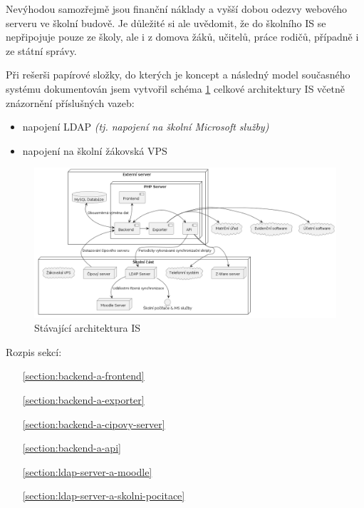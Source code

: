 \documentclass[FM,Proj]{tulthesis}
\begin{document}
Nevýhodou samozřejmě jsou finanční náklady a vyšší dobou odezvy webového serveru 
ve školní budově. Je důležité si ale uvědomit, že do školního IS se nepřipojuje 
pouze ze školy, ale i z domova žáků, učitelů, práce rodičů, případně i ze státní správy.  

Při rešerši papírové složky, do kterých je koncept a následný model současného systému dokumentován
jsem vytvořil schéma \ref{fig:puvodni-architektura} celkové architektury IS včetně znázornění 
příslušných vazeb:
\begin{itemize}
    \item napojení LDAP \textit{(tj. napojení na školní Microsoft služby)}
    \item napojení na školní žákovská VPS
\end{itemize}

\begin{landscape}
    \begin{figure}[H]
        \includegraphics[width=\linewidth]{architektura-puvodni.png}
        \caption{Stávající architektura IS}
        \label{fig:puvodni-architektura}
    \end{figure}
\end{landscape}

Rozpis sekcí:
\begin{enumerate}
    \item[\ref{section:backend-a-frontend}] 
    \item[\ref{section:backend-a-exporter}] 
    \item[\ref{section:backend-a-cipovy-server}] 
    \item[\ref{section:backend-a-api}] 
    \item[\ref{section:ldap-server-a-moodle}] 
    \item[\ref{section:ldap-server-a-skolni-pocitace}] 
\end{enumerate}
\end{document}
